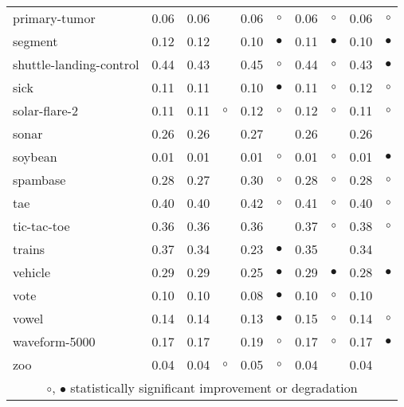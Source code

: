 {\begin{longtable}{lrr@{\hspace{0.1cm}}cr@{\hspace{0.1cm}}cr@{\hspace{0.1cm}}cr@{\hspace{0.1cm}}c}
primary-tumor & 0.06 & 0.06 &           & 0.06 &   $\circ$ & 0.06 &   $\circ$ & 0.06 &    $\circ$\\
segment & 0.12 & 0.12 &           & 0.10 & $\bullet$ & 0.11 & $\bullet$ & 0.10 &  $\bullet$\\
shuttle-landing-control & 0.44 & 0.43 &           & 0.45 &   $\circ$ & 0.44 &   $\circ$ & 0.43 &  $\bullet$\\
sick & 0.11 & 0.11 &           & 0.10 & $\bullet$ & 0.11 &   $\circ$ & 0.12 &    $\circ$\\
solar-flare-2 & 0.11 & 0.11 &   $\circ$ & 0.12 &   $\circ$ & 0.12 &   $\circ$ & 0.11 &    $\circ$\\
sonar & 0.26 & 0.26 &           & 0.27 &           & 0.26 &           & 0.26 &           \\
soybean & 0.01 & 0.01 &           & 0.01 &   $\circ$ & 0.01 &   $\circ$ & 0.01 &  $\bullet$\\
spambase & 0.28 & 0.27 &           & 0.30 &   $\circ$ & 0.28 &   $\circ$ & 0.28 &    $\circ$\\
tae & 0.40 & 0.40 &           & 0.42 &   $\circ$ & 0.41 &   $\circ$ & 0.40 &    $\circ$\\
tic-tac-toe & 0.36 & 0.36 &           & 0.36 &           & 0.37 &   $\circ$ & 0.38 &    $\circ$\\
trains & 0.37 & 0.34 &           & 0.23 & $\bullet$ & 0.35 &           & 0.34 &           \\
vehicle & 0.29 & 0.29 &           & 0.25 & $\bullet$ & 0.29 & $\bullet$ & 0.28 &  $\bullet$\\
vote & 0.10 & 0.10 &           & 0.08 & $\bullet$ & 0.10 &   $\circ$ & 0.10 &           \\
vowel & 0.14 & 0.14 &           & 0.13 & $\bullet$ & 0.15 &   $\circ$ & 0.14 &    $\circ$\\
waveform-5000 & 0.17 & 0.17 &           & 0.19 &   $\circ$ & 0.17 &   $\circ$ & 0.17 &  $\bullet$\\
zoo & 0.04 & 0.04 &   $\circ$ & 0.05 &   $\circ$ & 0.04 &           & 0.04 &           \\
\hline
\multicolumn{10}{c}{$\circ$, $\bullet$ statistically significant improvement or degradation}\\
\end{longtable} \footnotesize \par}